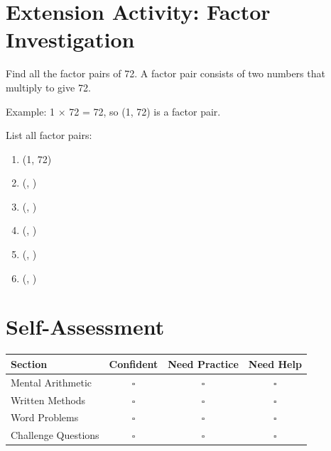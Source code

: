 \documentclass{article}
\begin{document}
\vspace{2cm}

\section{Extension Activity: Factor Investigation}
Find all the factor pairs of 72. A factor pair consists of two numbers that multiply to give 72.

Example: 1 × 72 = 72, so (1, 72) is a factor pair.

List all factor pairs:
\begin{enumerate}
    \item (1, 72)
    \item (\underline{\hspace{1cm}}, \underline{\hspace{1cm}})
    \item (\underline{\hspace{1cm}}, \underline{\hspace{1cm}})
    \item (\underline{\hspace{1cm}}, \underline{\hspace{1cm}})
    \item (\underline{\hspace{1cm}}, \underline{\hspace{1cm}})
    \item (\underline{\hspace{1cm}}, \underline{\hspace{1cm}})
\end{enumerate}

\vspace{1cm}

\section*{Self-Assessment}
\begin{tabular}{|l|c|c|c|}
\hline
\textbf{Section} & \textbf{Confident} & \textbf{Need Practice} & \textbf{Need Help} \\
\hline
Mental Arithmetic & $\square$ & $\square$ & $\square$ \\
\hline
Written Methods & $\square$ & $\square$ & $\square$ \\
\hline
Word Problems & $\square$ & $\square$ & $\square$ \\
\hline
Challenge Questions & $\square$ & $\square$ & $\square$ \\
\hline
\end{tabular}
\end{document}
